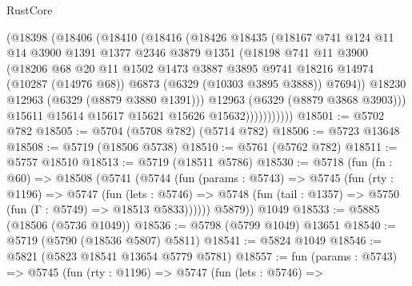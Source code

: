 \begin{lexlean}{RustCore}
\begin{coremodule}
                  (@18398
                    (@18406
                      (@18410
                        (@18416
                          (@18426
                            @18435
                            (@18167
                              @741
                              @124
                              @11
                              @14
                              @3900
                              @1391
                              @1377
                              @2346
                              @3879
                              @1351
                              (@18198
                                @741
                                @11
                                @3900
                                (@18206
                                  @68
                                  @20
                                  @11
                                  @1502
                                  @1473
                                  @3887
                                  @3895
                                  @9741
                                  @18216
                                  @14974
                                  (@10287 (@14976 @68))
                                  @6873
                                  (@6329 (@10303 @3895 @3888))
                                  @7694))
                              @18230
                              @12963
                              (@6329 (@8879 @3880 @1391)))
                            @12963
                            (@6329 (@8879 @3868 @3903)))
                          @15611
                          @15614
                          @15617
                          @15621
                          @15626
                          @15632)))))))))))
@18501 := @5702 @782
@18505 := @5704 (@5708 @782) (@5714 @782)
@18506 := @5723 @13648
@18508 := @5719 (@18506 @5738)
@18510 := @5761 (@5762 @782)
@18511 := @5757 @18510
@18513 := @5719 (@18511 @5786)
@18530 := @5718
    (fun (fn : @60) =>
    @18508
      (@5741
        (@5744
          (fun (params : @5743) =>
          @5745
            (fun (rty : @1196) =>
            @5747
              (fun (lets : @5746) =>
              @5748 (fun (tail : @1357) => @5750 (fun (Γ : @5749) => @18513 @5833))))))
        @5879))
    @1049
@18533 := @5885 (@18506 (@5736 @1049))
@18536 := @5798 (@5799 @1049) @13651
@18540 := @5719 (@5790 (@18536 @5807) @5811)
@18541 := @5824 @1049
@18546 := @5821 (@5823 @18541 @13654 @5779 @5781)
@18557 := fun (params : @5743) =>
  @5745
    (fun (rty : @1196) =>
    @5747
      (fun (lets : @5746) =>

\end{coremodule}
\end{lexlean}
